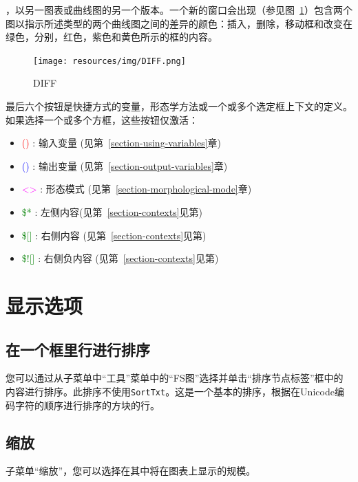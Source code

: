 \bigskip
{}，以另一图表或曲线图的另一个版本。一个新的窗口会出现（参见图~\ref{Graph-DIFF}）包含两个图以指示所述类型的两个曲线图之间的差异的颜色：插入，删除，移动框和改变在绿色，分别，红色，紫色和黄色所示的框的内容。

\begin{figure}[!h]
\begin{center}
\texttt{[image: resources/img/DIFF.png]}
\caption{DIFF\label{Graph-DIFF}}
\end{center}
\end{figure}

\bigskip
\noindent
最后六个按钮是快捷方式的变量，形态学方法或一个或多个选定框上下文的定义。如果选择一个或多个方框，这些按钮仅激活：
\begin{itemize}
\item \textcolor{red}{()}  : 输入变量	(见第~\ref{section-using-variables}章)
\item \textcolor{blue}{()} : 输出变量 (见第~\ref{section-output-variables}章)
\item \textcolor{magenta}{<>} : 形态模式 (见第~\ref{section-morphological-mode}章)
\item \textcolor{green}{\$*} : 左侧内容(见第~\ref{section-contexts}见第)
\item \textcolor{green}{\$[]} : 右侧内容 (见第~\ref{section-contexts}见第)
\item \textcolor{green}{\$![]} : 右侧负内容 (见第~\ref{section-contexts}见第)
\end{itemize}




\section{显示选项}

\subsection{在一个框里行进行排序}
您可以通过从子菜单中“工具”菜单中的“FS图”选择并单击“排序节点标签”框中的内容进行排序。此排序不使用\verb+SortTxt+。这是一个基本的排序，根据在Unicode编码字符的顺序进行排序的方块的行。


\subsection{缩放}
子菜单“缩放”，您可以选择在其中将在图表上显示的规模。

